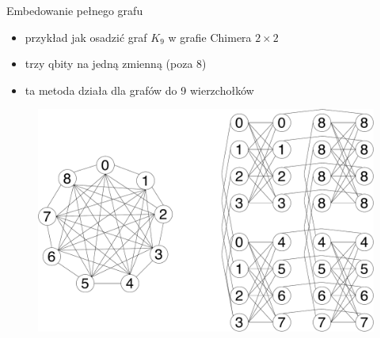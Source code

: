 \begin{frame}{Embedowanie pełnego grafu}
\begin{itemize}
    \item przykład jak osadzić graf $K_9$ w grafie Chimera $2\times2$
\item trzy qbity na jedną zmienną  (poza 8)
\item ta metoda działa dla grafów do 9 wierzchołków

\end{itemize}    
\begin{figure}[H]
    \centering
    \includegraphics[width=0.5\linewidth]{img/18/complete_chimera_k9_v2.pdf}
\end{figure} 
\end{frame}

